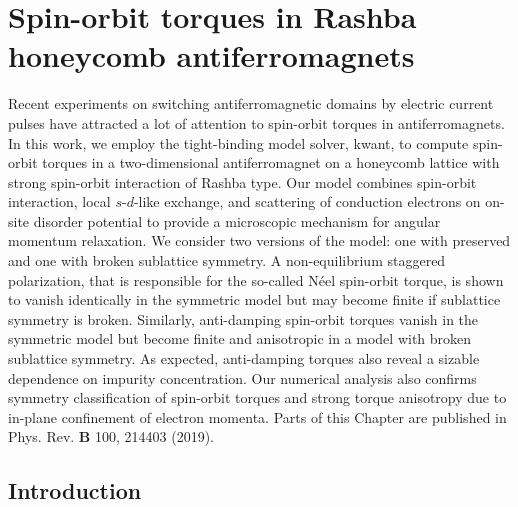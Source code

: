 \chapter{Spin-orbit torques in Rashba honeycomb antiferromagnets} %
Recent experiments on switching antiferromagnetic domains by electric current pulses have attracted a lot of attention to spin-orbit torques in antiferromagnets. In this work, we employ the tight-binding model solver, kwant,  to compute spin-orbit torques in a two-dimensional antiferromagnet on a honeycomb lattice with strong spin-orbit interaction of Rashba type. Our model combines spin-orbit interaction, local $s$-$d$-like exchange, and scattering of conduction electrons on on-site disorder potential to provide a microscopic mechanism for angular momentum relaxation. We consider two versions of the model: one with preserved and one with broken sublattice symmetry. A non-equilibrium staggered polarization, that is responsible for the so-called N\'eel spin-orbit torque, is shown to vanish identically in the symmetric model but may become finite if sublattice symmetry is broken. Similarly, anti-damping spin-orbit torques vanish in the symmetric model but become finite and anisotropic in a model with broken sublattice symmetry. As expected, anti-damping torques also reveal a sizable dependence on impurity concentration. Our numerical analysis also confirms symmetry classification of spin-orbit torques and strong torque anisotropy due to in-plane confinement of electron momenta. 
\vfill
Parts of this Chapter are published in Phys. Rev. \textbf{B} 100, 214403 (2019).
\clearpage

\section{Introduction}

